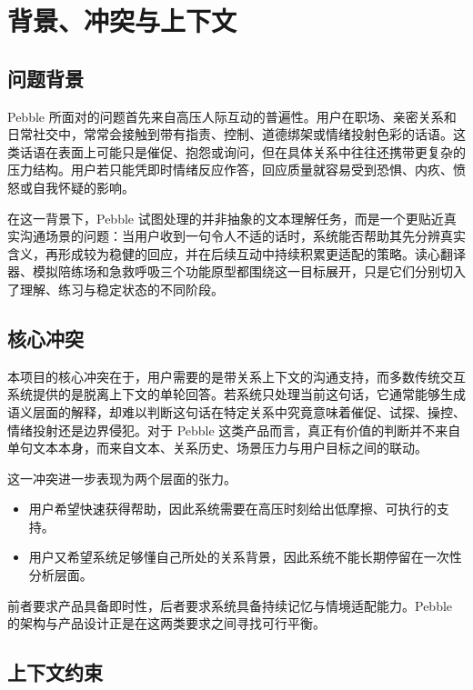 \chapter{背景、冲突与上下文}

\section{问题背景}

Pebble 所面对的问题首先来自高压人际互动的普遍性。用户在职场、亲密关系和日常社交中，常常会接触到带有指责、控制、道德绑架或情绪投射色彩的话语。这类话语在表面上可能只是催促、抱怨或询问，但在具体关系中往往还携带更复杂的压力结构。用户若只能凭即时情绪反应作答，回应质量就容易受到恐惧、内疚、愤怒或自我怀疑的影响。

在这一背景下，Pebble 试图处理的并非抽象的文本理解任务，而是一个更贴近真实沟通场景的问题：当用户收到一句令人不适的话时，系统能否帮助其先分辨真实含义，再形成较为稳健的回应，并在后续互动中持续积累更适配的策略。读心翻译器、模拟陪练场和急救呼吸三个功能原型都围绕这一目标展开，只是它们分别切入了理解、练习与稳定状态的不同阶段。

\section{核心冲突}

本项目的核心冲突在于，用户需要的是带关系上下文的沟通支持，而多数传统交互系统提供的是脱离上下文的单轮回答。若系统只处理当前这句话，它通常能够生成语义层面的解释，却难以判断这句话在特定关系中究竟意味着催促、试探、操控、情绪投射还是边界侵犯。对于 Pebble 这类产品而言，真正有价值的判断并不来自单句文本本身，而来自文本、关系历史、场景压力与用户目标之间的联动。

这一冲突进一步表现为两个层面的张力。

\begin{itemize}
  \item 用户希望快速获得帮助，因此系统需要在高压时刻给出低摩擦、可执行的支持。
  \item 用户又希望系统足够懂自己所处的关系背景，因此系统不能长期停留在一次性分析层面。
\end{itemize}

前者要求产品具备即时性，后者要求系统具备持续记忆与情境适配能力。Pebble 的架构与产品设计正是在这两类要求之间寻找可行平衡。

\section{上下文约束}

